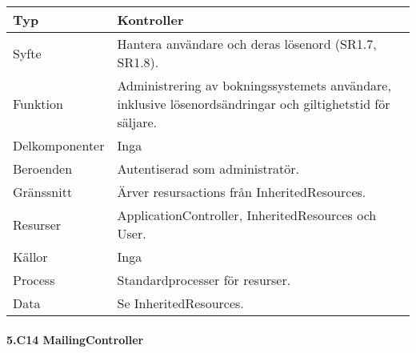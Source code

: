 \documentclass[a4paper, twoside, 11pt, titlepage]{article}
\begin{document}
			\begin {table} [ht] \begin{tabular} {  p{3.5cm} p{9.6cm} }
				\hline
				{Typ} & {Kontroller} \\
				\hline
				{Syfte} & {Hantera användare och deras lösenord (SR1.7, SR1.8).} \\
				\hline
				{Funktion} & {Administrering av bokningssystemets användare, inklusive lösenordsändringar och giltighetstid för säljare.} \\
				\hline
				{Delkomponenter} & {Inga} \\
				\hline
				{Beroenden} & {Autentiserad som administratör.} \\
				\hline
				{Gränssnitt} & {Ärver resursactions från InheritedResources.} \\
				\hline
				{Resurser} & {ApplicationController, InheritedResources och User.} \\
				\hline
				{Källor} & {Inga} \\
				\hline
				{Process} & {Standardprocesser för resurser.} \\
				\hline
				{Data} & {Se InheritedResources.} \\
				\hline
			\end{tabular} \end{table} \FloatBarrier


			\paragraph{5.C14 MailingController}\
\end{document}
